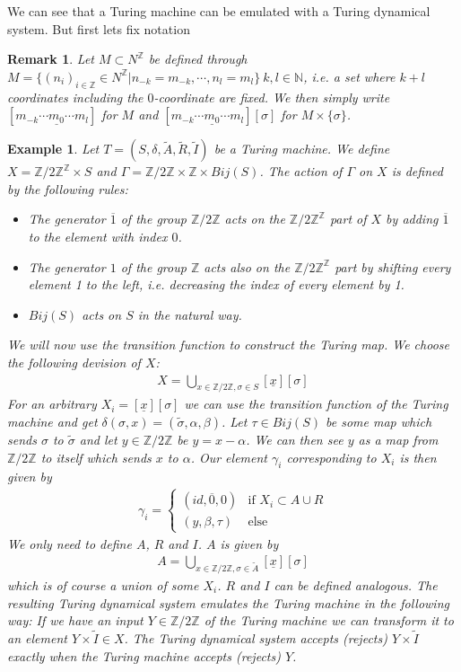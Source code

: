 \documentclass[12pt,a4paper]{scrartcl}
\newtheorem{Example}[Theorem]{Example}
\newtheorem{Remark}[Theorem]{Remark}
\numberwithin{equation}{section}
\newcommand{\Z}{\mathbb{Z}} %
\newcommand{\N}{\mathbb{N}} %
\newcommand{\2}{\mathbb{Z} / 2 \mathbb{Z}}
\newcommand{\1}{\bar{1}}
\newcommand{\0}{\bar{0}}
\begin{document}
We can see that a Turing machine can be emulated with a Turing dynamical system. But first lets fix notation
\begin{Remark}
	Let $M \subset N^\Z$  be defined through $M = \{(n_i)_{i \in \Z} \in N^\Z | n_{-k} = m_{-k}, \cdots, n_l = m_l \} \ k,l \in \N$, i.e. a set where $k+l$ coordinates including the $0$-coordinate are fixed. We then simply write $[m_{-k} \cdots \underline{m_0} \cdots m_l]$ for $M$ and $[m_{-k} \cdots \underline{m_0} \cdots m_l][\sigma]$ for $M \times \{\sigma\}$.
\end{Remark}
\begin{Example}\label{TMtoTDS}
	Let  $T=(S,\delta, \tilde{A}, \tilde{R}, \tilde{I})$ be a Turing machine. We define $X = \2^\Z \times S$ and $\Gamma =   \2 \times \Z \times Bij(S)$.
	The action of $\Gamma$ on $X$ is defined by the following rules:
	\begin{itemize}
		\item The generator $\overline{1}$ of the group $\Z / 2\Z$ acts on the $\Z / 2\Z^\Z$ part of $X$ by adding $\overline{1}$ to the element with index $0$.
		\item The generator $1$ of the group $\Z$ acts also on the $\Z / 2\Z^\Z$ part by shifting every element 1 to the left, i.e. decreasing the index of every element by 1.
		\item $Bij(S)$ acts on $S$ in the natural way.
	\end{itemize}
	We will now use the transition function to construct the Turing map. We choose the following devision of $X$:
	\begin{align*}
	X = \bigcup_{x \in \2, \sigma \in S} [\underline{x}][\sigma]
	\end{align*}
	For an arbitrary $X_i = [\underline{x}][\sigma]$ we can use the transition function of the Turing machine and get $\delta(\sigma, x) = (\tilde{\sigma}, \alpha, \beta)$. Let $\tau \in Bij(S)$ be some map which sends $\sigma$ to $\tilde{\sigma}$ and let $y \in \2$ be $y=x-\alpha$. We can then see $y$ as a map from $\2$ to itself which sends $x$ to $\alpha$. Our element $\gamma_i$ corresponding to $X_i$ is then given by 
	\begin{align*}
	\gamma_i = \begin{cases}
	(id, \overline{0}, 0) & \text{if } X_i \subset A \cup R \\
	(y, \beta, \tau) & \text{else}
	\end{cases}
	\end{align*} 
	We only need to define $A$, $R$ and $I$. $A$ is given by
	\begin{align*}
	A = \bigcup_{x \in \2, \sigma \in \tilde{A}}[\underline{x}][\sigma]
	\end{align*}
	which is of course a union of some $X_i$. $R$ and $I$ can be defined analogous. The resulting Turing dynamical system emulates the Turing machine in the following way: 
	If we have an input $Y \in \2$ of the Turing machine we can transform it to an element $Y \times \tilde{I} \in X$. The Turing dynamical system accepts (rejects) $Y \times \tilde{I}$ exactly when the Turing machine accepts (rejects) $Y$.
\end{Example} 
\end{document}
